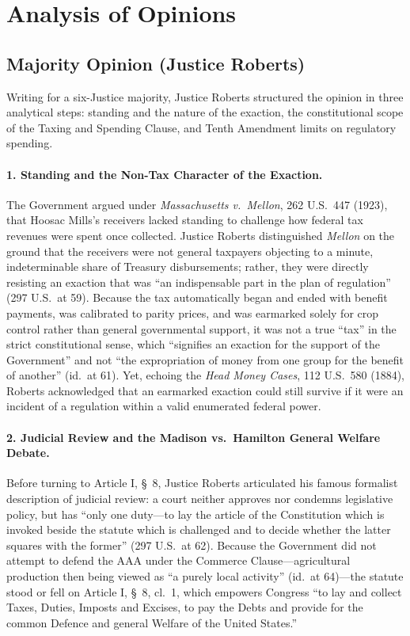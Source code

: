 \documentclass[12pt]{article}
\begin{document}
\section{Analysis of Opinions}
\subsection{Majority Opinion (Justice Roberts)}

Writing for a six-Justice majority, Justice Roberts structured the opinion in three analytical steps: standing and the nature of the exaction, the constitutional scope of the Taxing and Spending Clause, and Tenth Amendment limits on regulatory spending.

\paragraph{1. Standing and the Non-Tax Character of the Exaction.}
The Government argued under \textit{Massachusetts v.\ Mellon}, 262 U.S.\ 447 (1923), that Hoosac Mills's receivers lacked standing to challenge how federal tax revenues were spent once collected. Justice Roberts distinguished \textit{Mellon} on the ground that the receivers were not general taxpayers objecting to a minute, indeterminable share of Treasury disbursements; rather, they were directly resisting an exaction that was ``an indispensable part in the plan of regulation'' (297 U.S.\ at 59). Because the tax automatically began and ended with benefit payments, was calibrated to parity prices, and was earmarked solely for crop control rather than general governmental support, it was not a true ``tax'' in the strict constitutional sense, which ``signifies an exaction for the support of the Government'' and not ``the expropriation of money from one group for the benefit of another'' (id.\ at 61). Yet, echoing the \textit{Head Money Cases}, 112 U.S.\ 580 (1884), Roberts acknowledged that an earmarked exaction could still survive if it were an incident of a regulation within a valid enumerated federal power.

\paragraph{2. Judicial Review and the Madison vs.\ Hamilton General Welfare Debate.}
Before turning to Article I, \S\ 8, Justice Roberts articulated his famous formalist description of judicial review: a court neither approves nor condemns legislative policy, but has ``only one duty---to lay the article of the Constitution which is invoked beside the statute which is challenged and to decide whether the latter squares with the former'' (297 U.S.\ at 62). Because the Government did not attempt to defend the AAA under the Commerce Clause---agricultural production then being viewed as ``a purely local activity'' (id.\ at 64)---the statute stood or fell on Article I, \S\ 8, cl.\ 1, which empowers Congress ``to lay and collect Taxes, Duties, Imposts and Excises, to pay the Debts and provide for the common Defence and general Welfare of the United States.''
\end{document}
